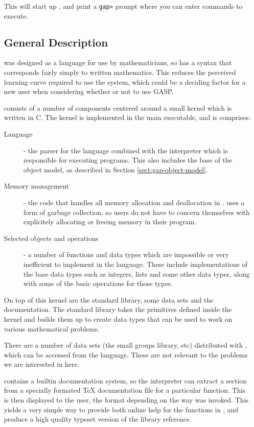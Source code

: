 This will start up \GAP{}, and print a \texttt{gap>} prompt where you can
enter \GAP{} commands to execute.

\subsection{General Description}

\GAP{} was designed as a language for use by mathematicians, so has a
syntax that corresponds fairly simply to written mathematics.  This reduces
the perceived learning curve required to use the system, which could
be a deciding factor for a new user when considering whether or not to
use GASP.

\GAP{} consists of a number of components centered around a small
kernel which is written in C.  The kernel is implemented in the main
\GAP{} executable, and is comprises:
\begin{description}
\item[Language] - the parser for the \GAP{} language combined with the
interpreter which is responsible for executing \GAP{} programs.  This
also includes the base of the \GAP{} object model, as described in
Section \ref{sect:gap-object-model}.
\item[Memory management] - the code that handles all memory allocation
and deallocation in \GAP.  \GAP{} uses a form of garbage collection,
so users do not have to concern themselves with explicitely allocating
or freeing memory in their program.
\item[Selected objects and operations] - a number of functions and
data types which are impossible or very inefficient to implement in
the \GAP{} language.  These include implementations of the base data
types such as integers, lists and some other data types, along with
some of the basic operations for those types.
\end{description}

On top of this kernel are the standard library, some data sets and the
documentation.  The standard library takes the primitives defined
inside the kernel and builds them up to create data types that can be
used to work on various mathematical problems.

There are a number of data sets (the small groups library, etc)
distributed with \GAP{}, which can be accessed from the language.  These
are not relevant to the problems we are interested in here.

\GAP{} contains a builtin documentation system, so the interpreter can
extract a section from a specially formated \TeX{} documentation file
for a particular function.  This is then displayed to the user, the
format depending on the way \GAP{} was invoked.  This yields a very
simple way to provide both online help for the functions in \GAP{},
and produce a high quality typeset version of the library reference.

